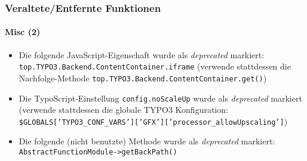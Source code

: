 \begin{frame}[fragile]
	\frametitle{Veraltete/Entfernte Funktionen}
	\framesubtitle{Misc (2)}


	\begin{itemize}

		\item Die folgende JavaScript-Eigenschaft wurde als \textit{deprecated} markiert:\newline
			\texttt{top.TYPO3.Backend.ContentContainer.iframe}\newline
			\smaller
				(verwende stattdessen die Nachfolge-Methode \texttt{top.TYPO3.Backend.ContentContainer.get()})
			\normalsize

		\item Die TypoScript-Einstellung \texttt{config.noScaleUp} wurde als \textit{deprecated} markiert\newline
			\smaller
				(verwende stattdessen die globale TYPO3 Konfiguration:\newline
				\texttt{\$GLOBALS['TYPO3\_CONF\_VARS']['GFX']['processor\_allowUpscaling']})
			\normalsize

		\item Die folgende (nicht benutzte) Methode wurde als \textit{deprecated} markiert:\newline
			\texttt{AbstractFunctionModule->getBackPath()}

	\end{itemize}

\end{frame}






